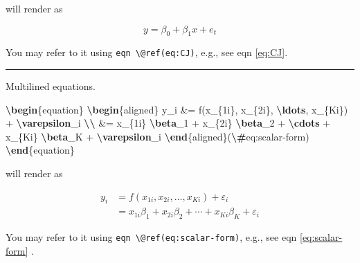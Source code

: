 \documentclass[
  a4paper,
  twoside,
  openright]{book}
\newenvironment{Shaded}{\begin{snugshade}}{\end{snugshade}}
\newcommand{\ExtensionTok}[1]{#1}
\newcommand{\KeywordTok}[1]{\textcolor[rgb]{0.13,0.29,0.53}{\textbf{#1}}}
\newcommand{\NormalTok}[1]{#1}
\newcommand{\SpecialCharTok}[1]{\textcolor[rgb]{0.81,0.36,0.00}{\textbf{#1}}}
\newcommand{\SpecialStringTok}[1]{\textcolor[rgb]{0.31,0.60,0.02}{#1}}
\theoremstyle{definition}
\theoremstyle{definition}
\theoremstyle{definition}
\theoremstyle{definition}
\theoremstyle{remark}
\begin{document}
will render as

\begin{equation} 
y=\beta_0 + \beta_1x + e_t
\label{eq:CJ}
\end{equation}

You may refer to it using \texttt{eqn\ \textbackslash{}@ref(eq:CJ)}, e.g., see eqn \eqref{eq:CJ}.

\begin{center}\rule{0.5\linewidth}{0.5pt}\end{center}

\begin{Shaded}
\begin{Highlighting}[]
\NormalTok{Multilined equations.}
  
\KeywordTok{\textbackslash{}begin}\NormalTok{\{}\ExtensionTok{equation}\NormalTok{\}}\SpecialStringTok{ }
\KeywordTok{\textbackslash{}begin}\NormalTok{\{}\ExtensionTok{aligned}\NormalTok{\}}
\SpecialStringTok{y\_i \&= f(x\_\{1i\}, x\_\{2i\}, }\SpecialCharTok{\textbackslash{}ldots}\SpecialStringTok{, x\_\{Ki\}) + }\SpecialCharTok{\textbackslash{}varepsilon}\SpecialStringTok{\_i }\SpecialCharTok{\textbackslash{}\textbackslash{}}
\SpecialStringTok{\&= x\_\{1i\} }\SpecialCharTok{\textbackslash{}beta}\SpecialStringTok{\_1 + x\_\{2i\} }\SpecialCharTok{\textbackslash{}beta}\SpecialStringTok{\_2 + }\SpecialCharTok{\textbackslash{}cdots}\SpecialStringTok{ + x\_\{Ki\} }\SpecialCharTok{\textbackslash{}beta}\SpecialStringTok{\_K + }\SpecialCharTok{\textbackslash{}varepsilon}\SpecialStringTok{\_i}
\KeywordTok{\textbackslash{}end}\NormalTok{\{}\ExtensionTok{aligned}\NormalTok{\}}\SpecialStringTok{(}\SpecialCharTok{\textbackslash{}\#}\SpecialStringTok{eq:scalar{-}form)}
\KeywordTok{\textbackslash{}end}\NormalTok{\{}\ExtensionTok{equation}\NormalTok{\}}
\end{Highlighting}
\end{Shaded}

will render as

\begin{equation} 
\begin{aligned}
y_i &= f(x_{1i}, x_{2i}, \ldots, x_{Ki}) + \varepsilon_i \\
&= x_{1i} \beta_1 + x_{2i} \beta_2 + \cdots + x_{Ki} \beta_K + \varepsilon_i
\end{aligned}\label{eq:scalar-form}
\end{equation}

You may refer to it using \texttt{eqn\ \textbackslash{}@ref(eq:scalar-form)}, e.g., see eqn \eqref{eq:scalar-form} .
\end{document}
